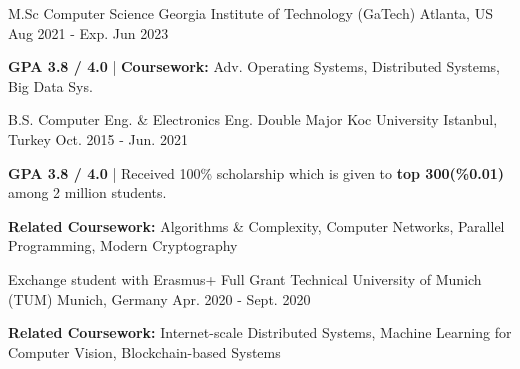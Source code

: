 \begin{cventries}

\cvopenentry
    {M.Sc Computer Science } %
    {Georgia Institute of Technology (GaTech)} %
    {Atlanta, US} %
    {Aug 2021 - Exp. Jun 2023} %
    {\begin{cvghostitems} %
        \item {\textbf{GPA 3.8 / 4.0} | \textbf{Coursework:} Adv. Operating Systems, Distributed Systems, Big Data Sys. }
      \end{cvghostitems}
    }
\cvopenentry
    {B.S. Computer Eng. \& Electronics Eng. Double Major} %
    {Koc University } %
    {Istanbul, Turkey} %
    {Oct. 2015 - Jun. 2021} %
    {
      \begin{cvitems} %
        \item {\textbf{GPA 3.8 / 4.0} | Received 100\% scholarship which is given to \textbf{top 300(\%0.01)} among 2 million students.}
        \item {\textbf{Related Coursework:} Algorithms \& Complexity, Computer Networks, Parallel Programming, Modern Cryptography}
      \end{cvitems}
    }
\cvopenentry
    {Exchange student with Erasmus+ Full Grant }
    {Technical University of Munich (TUM)} %
    {Munich, Germany} %
    {Apr. 2020 - Sept. 2020} %
    {\begin{cvitems} %
        \item {\textbf{Related Coursework:} Internet-scale Distributed Systems, Machine Learning for Computer Vision, Blockchain-based Systems}

\end{cvitems}}
\end{cventries}
